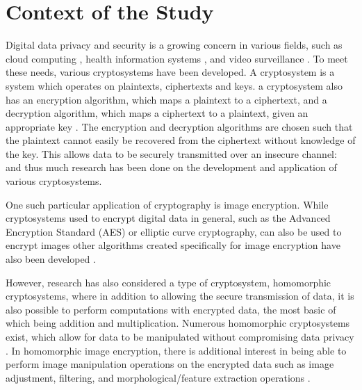 
\section{Context of the Study}

Digital data privacy and security is a growing concern in various fields, such as cloud computing \cite{potey_homomorphic_2016}, health information systems \cite{kester_cryptographic_2015}, and video surveillance \cite{upmanyu_efficient_2009}. To meet these needs, various cryptosystems have been developed. A cryptosystem is a system which operates on plaintexts, ciphertexts and keys. a cryptosystem also has an encryption algorithm, which maps a plaintext to a ciphertext, and a decryption algorithm, which maps a ciphertext to a plaintext, given an appropriate key \cite{bauer_cryptosystem_2005}. The encryption and decryption algorithms are chosen such that the plaintext cannot easily be recovered from the ciphertext without knowledge of the key. This allows data to be securely transmitted over an insecure channel:  and thus much research has been done on the development and application of various cryptosystems.

One such particular application of cryptography is image encryption. While cryptosystems used to encrypt digital data in general, such as the Advanced Encryption Standard (AES) or elliptic curve cryptography, can also be used to encrypt images \cite{jain_image_2016, singh_image_2015} other algorithms created specifically for image encryption have also been developed \cite{murugan_survey_2018}.

However, research has also considered a type of cryptosystem, homomorphic cryptosystems, where in addition to allowing the secure transmission of data, it is also possible to perform computations with encrypted data, the most basic of which being addition and multiplication. Numerous homomorphic cryptosystems exist, which allow for data to be manipulated without compromising data privacy \cite{fontaine_survey_2007, sen_homomorphic_2013}. In homomorphic image encryption, there is additional interest in being able to perform image manipulation operations on the encrypted data such as image adjustment, filtering, and morphological/feature extraction operations \cite{ziad_cryptoimg:_2016, gonzalez_digital_2008}.
